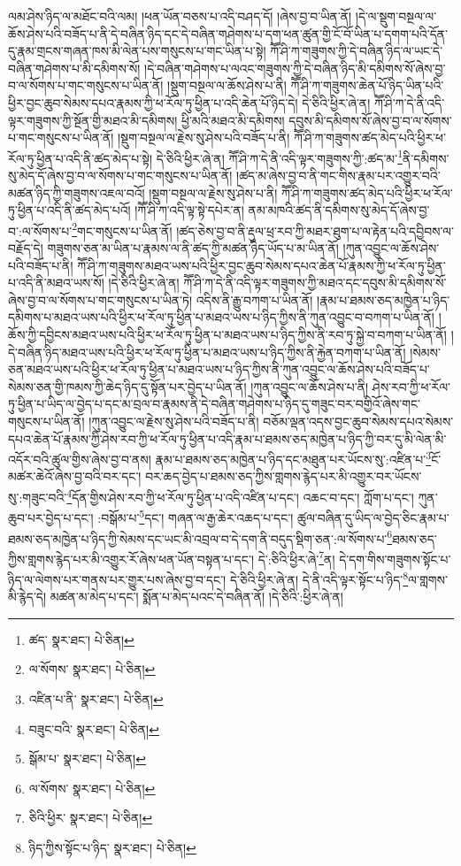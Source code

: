 ལམ་ཤེས་ཉིད་ལ་མཐོང་བའི་ལམ། །ཕན་ཡོན་བཅས་པ་འདི་བཤད་དོ། །ཞེས་བྱ་བ་ཡིན་ནོ། །དེ་ལ་སྡུག་བསྔལ་ལ་ཆོས་ཤེས་པའི་བཟོད་པ་ནི་དེ་བཞིན་ཉིད་དང་དེ་བཞིན་གཤེགས་པ་དག་ཕན་ཚུན་གྱི་ངོ་བོ་ཡིན་པ་དགག་པའི་དོན་དུ་རྣམ་གྲངས་གཞན་ཁས་མི་ལེན་པས་གསུངས་པ་གང་ཡིན་པ་སྟེ། ཀཽ་ཤི་ཀ་གཟུགས་ཀྱི་དེ་བཞིན་ཉིད་ལ་ཡང་དེ་བཞིན་གཤེགས་པ་མི་དམིགས་སོ། །དེ་བཞིན་གཤེགས་པ་ལའང་གཟུགས་ཀྱི་དེ་བཞིན་ཉིད་མི་དམིགས་སོ་ཞེས་བྱ་བ་ལ་སོགས་པ་གང་གསུངས་པ་ཡིན་ནོ། །སྡུག་བསྔལ་ལ་ཆོས་ཤེས་པ་ནི། ཀཽ་ཤི་ཀ་གཟུགས་ཆེན་པོ་ཉིད་ཡིན་པའི་ཕྱིར་བྱང་ཆུབ་སེམས་དཔའ་རྣམས་ཀྱི་ཕ་རོལ་ཏུ་ཕྱིན་པ་འདི་ཆེན་པོ་ཉིད་དེ། དེ་ཅིའི་ཕྱིར་ཞེ་ན། ཀཽ་ཤི་ཀ་དེ་ནི་འདི་ལྟར་གཟུགས་ཀྱི་སྔོན་གྱི་མཐའ་མི་དམིགས། ཕྱི་མའི་མཐའ་མི་དམིགས། དབུས་མི་དམིགས་སོ་ཞེས་བྱ་བ་ལ་སོགས་པ་གང་གསུངས་པ་ཡིན་ནོ། །སྡུག་བསྔལ་ལ་རྗེས་སུ་ཤེས་པའི་བཟོད་པ་ནི། ཀཽ་ཤི་ཀ་གཟུགས་ཚད་མེད་པའི་ཕྱིར་ཕ་རོལ་ཏུ་ཕྱིན་པ་འདི་ནི་ཚད་མེད་པ་སྟེ། དེ་ཅིའི་ཕྱིར་ཞེ་ན། ཀཽ་ཤི་ཀ་དེ་ནི་འདི་ལྟར་གཟུགས་ཀྱི་:ཚད་མ་\footnote{ཚད་  སྣར་ཐང་།  པེ་ཅིན། }ནི་དམིགས་སུ་མེད་དོ་ཞེས་བྱ་བ་ལ་སོགས་པ་གང་གསུངས་པ་ཡིན་ནོ། །ཚད་མ་ཞེས་བྱ་བ་ནི་གང་གིས་རྣམ་པར་འགྱུར་བའི་མཚན་ཉིད་ཀྱི་གཟུགས་འཇལ་བའོ། །སྡུག་བསྔལ་ལ་རྗེས་སུ་ཤེས་པ་ནི། ཀཽ་ཤི་ཀ་གཟུགས་ཚད་མེད་པའི་ཕྱིར་ཕ་རོལ་ཏུ་ཕྱིན་པ་འདི་ནི་ཚད་མེད་པའོ། །ཀཽ་ཤི་ཀ་འདི་ལྟ་སྟེ་དཔེར་ན། ནམ་མཁའི་ཚད་ནི་དམིགས་སུ་མེད་དོ་ཞེས་བྱ་བ་:ལ་སོགས་པ་\footnote{ལ་སོགས་  སྣར་ཐང་།  པེ་ཅིན། }གང་གསུངས་པ་ཡིན་ནོ། །ཚད་ཅེས་བྱ་བ་ནི་རྡུལ་ཕྲ་རབ་ཀྱི་མཐར་ཐུག་པ་ལ་རྟེན་པའི་དབྱིབས་ལ་བརྗོད་དེ། གཟུགས་ཅན་མ་ཡིན་པ་རྣམས་ལ་ནི་ཚད་ཀྱི་མཚན་ཉིད་ཡོད་པ་མ་ཡིན་ནོ། །ཀུན་འབྱུང་ལ་ཆོས་ཤེས་པའི་བཟོད་པ་ནི། ཀཽ་ཤི་ཀ་གཟུགས་མཐའ་ཡས་པའི་ཕྱིར་བྱང་ཆུབ་སེམས་དཔའ་ཆེན་པོ་རྣམས་ཀྱི་ཕ་རོལ་ཏུ་ཕྱིན་པ་འདི་ནི་མཐའ་ཡས་སོ། །དེ་ཅིའི་ཕྱིར་ཞེ་ན། ཀཽ་ཤི་ཀ་དེ་ནི་འདི་ལྟར་གཟུགས་ཀྱི་མཐའ་དང་དབུས་མི་དམིགས་སོ་ཞེས་བྱ་བ་ལ་སོགས་པ་གང་གསུངས་པ་ཡིན་ཏེ། འདིས་ནི་རྒྱུ་བཀག་པ་ཡིན་ནོ། །རྣམ་པ་ཐམས་ཅད་མཁྱེན་པ་ཉིད་དམིགས་པ་མཐའ་ཡས་པའི་ཕྱིར་ཕ་རོལ་ཏུ་ཕྱིན་པ་མཐའ་ཡས་པ་ཉིད་ཀྱིས་ནི་ཀུན་འབྱུང་བ་བཀག་པ་ཡིན་ནོ། །ཆོས་ཀྱི་དབྱིངས་མཐའ་ཡས་པའི་ཕྱིར་ཕ་རོལ་ཏུ་ཕྱིན་པ་མཐའ་ཡས་པ་ཉིད་ཀྱིས་ནི་རབ་ཏུ་སྐྱེ་བ་བཀག་པ་ཡིན་ནོ། །དེ་བཞིན་ཉིད་མཐའ་ཡས་པའི་ཕྱིར་ཕ་རོལ་ཏུ་ཕྱིན་པ་མཐའ་ཡས་པ་ཉིད་ཀྱིས་ནི་རྐྱེན་བཀག་པ་ཡིན་ནོ། །སེམས་ཅན་མཐའ་ཡས་པའི་ཕྱིར་ཕ་རོལ་ཏུ་ཕྱིན་པ་མཐའ་ཡས་པ་ཉིད་ཀྱིས་ནི་ཀུན་འབྱུང་ལ་ཆོས་ཤེས་པའི་བཟོད་པ་སེམས་ཅན་གྱི་ཁམས་ཀྱི་ཆེད་ཉིད་དུ་སྟོན་པར་བྱེད་པ་ཡིན་ནོ། །ཀུན་འབྱུང་ལ་ཆོས་ཤེས་པ་ནི། ཤེས་རབ་ཀྱི་ཕ་རོལ་ཏུ་ཕྱིན་པ་ཡིད་ལ་བྱེད་པ་དང་མ་བྲལ་བ་རྣམས་ནི་དེ་བཞིན་གཤེགས་པ་ཉིད་དུ་གཟུང་བར་བགྱིའོ་ཞེས་གང་གསུངས་པ་ཡིན་ནོ། །ཀུན་འབྱུང་ལ་རྗེས་སུ་ཤེས་པའི་བཟོད་པ་ནི། བཅོམ་ལྡན་འདས་བྱང་ཆུབ་སེམས་དཔའ་སེམས་དཔའ་ཆེན་པོ་རྣམས་ཀྱི་ཤེས་རབ་ཀྱི་ཕ་རོལ་ཏུ་ཕྱིན་པ་འདི་རྣམ་པ་ཐམས་ཅད་མཁྱེན་པ་ཉིད་ཀྱི་བར་དུ་མི་ལེན་མི་འདོར་བའི་ཚུལ་གྱིས་ཞེས་བྱ་བ་ནས། རྣམ་པ་ཐམས་ཅད་མཁྱེན་པ་ཉིད་དང་མཐུན་པར་ཡོངས་སུ་:འཛིན་པ་\footnote{འཛིན་པ་ནི་  སྣར་ཐང་།  པེ་ཅིན། }ངོ་མཚར་ཆེའོ་ཞེས་བྱ་བའི་བར་དང་། བར་ཆད་བྱེད་པ་ཐམས་ཅད་ཀྱིས་གླགས་རྙེད་པར་མི་འགྱུར་བར་ཡོངས་སུ་:གཟུང་བའི་\footnote{བཟུང་བའི་  སྣར་ཐང་།  པེ་ཅིན། }དོན་གྱིས་ཤེས་རབ་ཀྱི་ཕ་རོལ་ཏུ་ཕྱིན་པ་འདི་འཛིན་པ་དང་། འཆང་བ་དང་། ཀློག་པ་དང་། ཀུན་ཆུབ་པར་བྱེད་པ་དང་། :བསྒོམ་པ་\footnote{སྒོམ་པ་  སྣར་ཐང་།  པེ་ཅིན། }དང་། གཞན་ལ་རྒྱ་ཆེར་འཆད་པ་དང་། ཚུལ་བཞིན་དུ་ཡིད་ལ་བྱེད་ཅིང་རྣམ་པ་ཐམས་ཅད་མཁྱེན་པ་ཉིད་ཀྱི་སེམས་དང་ཡང་མི་འབྲལ་བ་དེ་དག་ནི་བདུད་སྡིག་ཅན་:ལ་སོགས་པ་\footnote{ལ་སོགས་  སྣར་ཐང་།  པེ་ཅིན། }ཐམས་ཅད་ཀྱིས་གླགས་རྙེད་པར་མི་འགྱུར་རོ་ཞེས་ཕན་ཡོན་བསྟན་པ་དང་། དེ་:ཅིའི་ཕྱིར་ཞེ་\footnote{ཅིའི་ཕྱིར་  སྣར་ཐང་།  པེ་ཅིན། }ན། དེ་དག་གིས་གཟུགས་སྟོང་པ་ཉིད་ལ་ལེགས་པར་གནས་པར་གྱུར་པས་ཞེས་བྱ་བ་དང་། དེ་ཅིའི་ཕྱིར་ཞེ་ན། དེ་ནི་འདི་ལྟར་སྟོང་པ་ཉིད་\footnote{ཉིད་ཀྱིས་སྟོང་པ་ཉིད་  སྣར་ཐང་།  པེ་ཅིན། }ལ་གླགས་མི་རྙེད་དེ། མཚན་མ་མེད་པ་དང་། སྨོན་པ་མེད་པའང་དེ་བཞིན་ནོ། །དེ་ཅིའི་:ཕྱིར་ཞེ་ན། 
